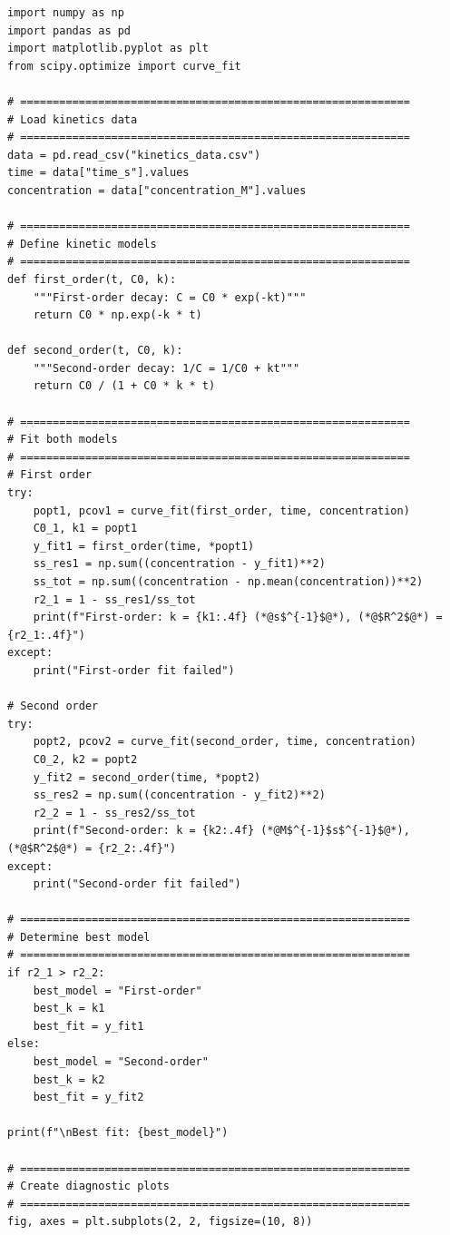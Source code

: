 \begin{lstlisting}
import numpy as np
import pandas as pd
import matplotlib.pyplot as plt
from scipy.optimize import curve_fit

# ============================================================
# Load kinetics data
# ============================================================
data = pd.read_csv("kinetics_data.csv")
time = data["time_s"].values
concentration = data["concentration_M"].values

# ============================================================
# Define kinetic models
# ============================================================
def first_order(t, C0, k):
    """First-order decay: C = C0 * exp(-kt)"""
    return C0 * np.exp(-k * t)

def second_order(t, C0, k):
    """Second-order decay: 1/C = 1/C0 + kt"""
    return C0 / (1 + C0 * k * t)

# ============================================================
# Fit both models
# ============================================================
# First order
try:
    popt1, pcov1 = curve_fit(first_order, time, concentration)
    C0_1, k1 = popt1
    y_fit1 = first_order(time, *popt1)
    ss_res1 = np.sum((concentration - y_fit1)**2)
    ss_tot = np.sum((concentration - np.mean(concentration))**2)
    r2_1 = 1 - ss_res1/ss_tot
    print(f"First-order: k = {k1:.4f} (*@s$^{-1}$@*), (*@$R^2$@*) = {r2_1:.4f}")
except:
    print("First-order fit failed")

# Second order
try:
    popt2, pcov2 = curve_fit(second_order, time, concentration)
    C0_2, k2 = popt2
    y_fit2 = second_order(time, *popt2)
    ss_res2 = np.sum((concentration - y_fit2)**2)
    r2_2 = 1 - ss_res2/ss_tot
    print(f"Second-order: k = {k2:.4f} (*@M$^{-1}$s$^{-1}$@*), (*@$R^2$@*) = {r2_2:.4f}")
except:
    print("Second-order fit failed")

# ============================================================
# Determine best model
# ============================================================
if r2_1 > r2_2:
    best_model = "First-order"
    best_k = k1
    best_fit = y_fit1
else:
    best_model = "Second-order"
    best_k = k2
    best_fit = y_fit2

print(f"\nBest fit: {best_model}")

# ============================================================
# Create diagnostic plots
# ============================================================
fig, axes = plt.subplots(2, 2, figsize=(10, 8))


\end{lstlisting}
